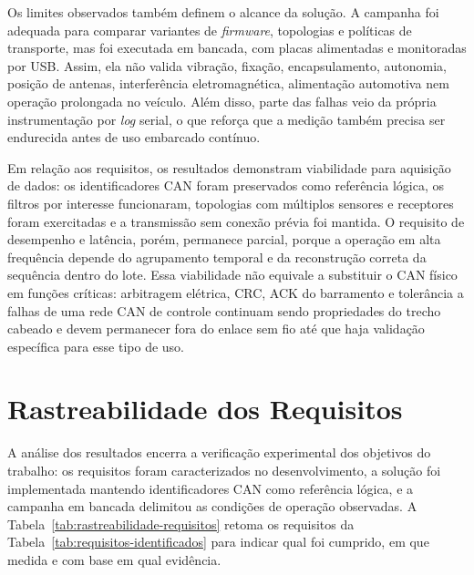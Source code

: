Os limites observados também definem o alcance da solução. A campanha foi
adequada para comparar variantes de \emph{firmware}, topologias e políticas de
transporte, mas foi executada em bancada, com placas alimentadas e monitoradas
por USB. Assim, ela não valida vibração, fixação, encapsulamento, autonomia,
posição de antenas, interferência eletromagnética, alimentação automotiva nem
operação prolongada no veículo. Além disso, parte das falhas veio da própria
instrumentação por \emph{log} serial, o que reforça que a medição também precisa
ser endurecida antes de uso embarcado contínuo.

Em relação aos requisitos, os resultados demonstram viabilidade para aquisição
de dados: os identificadores CAN foram preservados como referência lógica, os
filtros por interesse funcionaram, topologias com múltiplos sensores e
receptores foram exercitadas e a transmissão sem conexão prévia foi mantida. O
requisito de desempenho e latência, porém, permanece parcial, porque a operação
em alta frequência depende do agrupamento temporal e da reconstrução correta da
sequência dentro do lote. Essa viabilidade não equivale a substituir o CAN
físico em funções críticas: arbitragem elétrica, CRC, ACK do barramento e
tolerância a falhas de uma rede CAN de controle continuam sendo propriedades do
trecho cabeado e devem permanecer fora do enlace sem fio até que haja validação
específica para esse tipo de uso.

\section{Rastreabilidade dos Requisitos}

A análise dos resultados encerra a verificação experimental dos objetivos do
trabalho: os requisitos foram caracterizados no desenvolvimento, a solução foi
implementada mantendo identificadores CAN como referência lógica, e a campanha em
bancada delimitou as condições de operação observadas. A
Tabela~\ref{tab:rastreabilidade-requisitos} retoma os requisitos da
Tabela~\ref{tab:requisitos-identificados} para indicar qual foi cumprido, em
que medida e com base em qual evidência.

